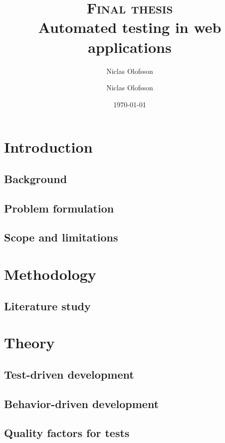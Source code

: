 \documentclass[a4paper]{report}
\author{Niclas Olofsson}
\title{\textsc{Final thesis}\\\Huge\textbf{Automated testing in web applications}}
\author{Niclas Olofsson}
\date{\today}
\begin{document}
\maketitle
\newpage

\begin{abstract}

\end{abstract}

\renewcommand{\abstractname}{Acknowledgments}
\begin{abstract}

\end{abstract}

\tableofcontents
\thispagestyle{empty} %
\newpage

\setcounter{page}{1}

\chapter{Introduction}

  \section{Background}
  

  \section{Problem formulation}
  

  \section{Scope and limitations}
  


\chapter{Methodology}
  

  \section{Literature study}
  


\chapter{Theory}

  \section{Test-driven development}
  

  \section{Behavior-driven development}
  

  \section{Quality factors for tests}
  


\newpage


\end{document}
